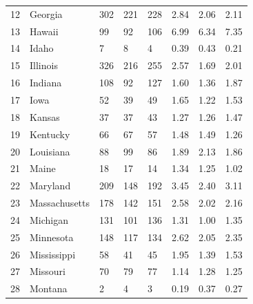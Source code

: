 \documentclass[
  letterpaper,
  DIV=11,
  numbers=noendperiod]{scrreprt}
\begin{document}
\begin{tabular}{lllllrrr}
12 &               Georgia &             302 &        221 &        228 &          2.84 &        2.06 &        2.11 \\
13 &                Hawaii &              99 &         92 &        106 &          6.99 &        6.34 &        7.35 \\
14 &                 Idaho &               7 &          8 &          4 &          0.39 &        0.43 &        0.21 \\
15 &              Illinois &             326 &        216 &        255 &          2.57 &        1.69 &        2.01 \\
16 &               Indiana &             108 &         92 &        127 &          1.60 &        1.36 &        1.87 \\
17 &                  Iowa &              52 &         39 &         49 &          1.65 &        1.22 &        1.53 \\
18 &                Kansas &              37 &         37 &         43 &          1.27 &        1.26 &        1.47 \\
19 &              Kentucky &              66 &         67 &         57 &          1.48 &        1.49 &        1.26 \\
20 &             Louisiana &              88 &         99 &         86 &          1.89 &        2.13 &        1.86 \\
21 &                 Maine &              18 &         17 &         14 &          1.34 &        1.25 &        1.02 \\
22 &              Maryland &             209 &        148 &        192 &          3.45 &        2.40 &        3.11 \\
23 &         Massachusetts &             178 &        142 &        151 &          2.58 &        2.02 &        2.16 \\
24 &              Michigan &             131 &        101 &        136 &          1.31 &        1.00 &        1.35 \\
25 &             Minnesota &             148 &        117 &        134 &          2.62 &        2.05 &        2.35 \\
26 &           Mississippi &              58 &         41 &         45 &          1.95 &        1.39 &        1.53 \\
27 &              Missouri &              70 &         79 &         77 &          1.14 &        1.28 &        1.25 \\
28 &               Montana &               2 &          4 &          3 &          0.19 &        0.37 &        0.27 \\

\end{tabular}
\end{document}
